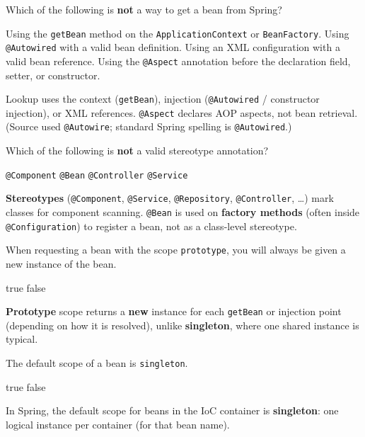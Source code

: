 \question[4]
Which of the following is \textbf{not} a way to get a bean from Spring?
\begin{choices}
  \choice Using the \texttt{getBean} method on the \texttt{ApplicationContext} or \texttt{BeanFactory}.
  \choice Using \texttt{@Autowired} with a valid bean definition.
  \choice Using an XML configuration with a valid bean reference.
  \CorrectChoice Using the \texttt{@Aspect} annotation before the declaration field, setter, or constructor.
\end{choices}
\begin{solution}
  Lookup uses the context (\texttt{getBean}), injection (\texttt{@Autowired} / constructor injection), or XML references. \texttt{@Aspect} declares AOP aspects, not bean retrieval. (Source used \texttt{@Autowire}; standard Spring spelling is \texttt{@Autowired}.)
\end{solution}

\question[4]
Which of the following is \textbf{not} a valid stereotype annotation?
\begin{choices}
  \choice \texttt{@Component}
  \CorrectChoice \texttt{@Bean}
  \choice \texttt{@Controller}
  \choice \texttt{@Service}
\end{choices}
\begin{solution}
  \textbf{Stereotypes} (\texttt{@Component}, \texttt{@Service}, \texttt{@Repository}, \texttt{@Controller}, \ldots) mark classes for component scanning. \texttt{@Bean} is used on \textbf{factory methods} (often inside \texttt{@Configuration}) to register a bean, not as a class-level stereotype.
\end{solution}

\question[4]
When requesting a bean with the scope \texttt{prototype}, you will always be given a new instance of the bean.
\begin{choices}
  \CorrectChoice true
  \choice false
\end{choices}
\begin{solution}
  \textbf{Prototype} scope returns a \textbf{new} instance for each \texttt{getBean} or injection point (depending on how it is resolved), unlike \textbf{singleton}, where one shared instance is typical.
\end{solution}

\question[4]
The default scope of a bean is \texttt{singleton}.
\begin{choices}
  \CorrectChoice true
  \choice false
\end{choices}
\begin{solution}
  In Spring, the default scope for beans in the IoC container is \textbf{singleton}: one logical instance per container (for that bean name).
\end{solution}

